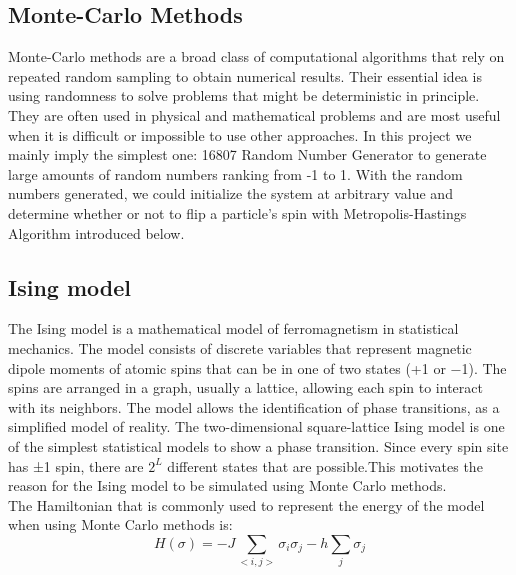 \documentclass[prl,aps,twocolumn]{revtex4}
\begin{document}
	\subsection{Monte-Carlo Methods}Monte-Carlo methods are a broad class of computational algorithms that rely on repeated random sampling to obtain numerical results. Their essential idea is using randomness to solve problems that might be deterministic in principle. They are often used in physical and mathematical problems and are most useful when it is difficult or impossible to use other approaches. In this project we mainly imply the simplest one: 16807 Random Number Generator to generate large amounts of random numbers ranking from -1 to 1. With the random numbers generated, we could initialize the system at arbitrary value and determine whether or not to flip a particle's spin with Metropolis-Hastings Algorithm introduced below.
    \subsection{Ising model}The Ising model is a mathematical model of ferromagnetism in statistical mechanics. The model consists of discrete variables that represent magnetic dipole moments of atomic spins that can be in one of two states (+1 or −1). The spins are arranged in a graph, usually a lattice, allowing each spin to interact with its neighbors. The model allows the identification of phase transitions, as a simplified model of reality. The two-dimensional square-lattice Ising model is one of the simplest statistical models to show a phase transition.
    \indent Since every spin site has ±1 spin, there are $2^L$ different states that are possible.This motivates the reason for the Ising model to be simulated using Monte Carlo methods.\\
    The Hamiltonian that is commonly used to represent the energy of the model when using Monte Carlo methods is:
    \begin{equation}
      H(\sigma)=-J\sum_{<i,j>}\sigma_i\sigma_j-h\sum_{j}\sigma_j
    \end{equation}
\end{document}
